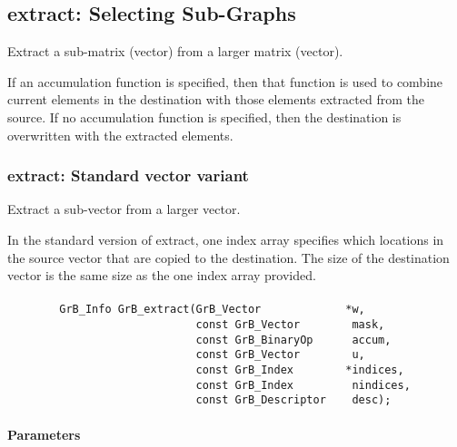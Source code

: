 \subsection{{\sf extract}: Selecting Sub-Graphs}
\label{Sec:extract}

Extract a sub-matrix (vector) from a larger matrix (vector). 

If an accumulation function is specified, then that function is
used to combine current elements in the destination with those elements
extracted from the source. If no accumulation function is specified, then
the destination is overwritten with the extracted elements.  


\subsubsection{{\sf extract}: Standard vector variant}

Extract a sub-vector from a larger vector. 

In the standard version of {\sf extract}, one index array
specifies which locations in the source vector that are copied to
the destination.  The size of the destination vector is the same size as
the one index array provided.  

\paragraph{\syntax}

\begin{verbatim}
        GrB_Info GrB_extract(GrB_Vector             *w,
                             const GrB_Vector        mask,
                             const GrB_BinaryOp      accum,
                             const GrB_Vector        u,
                             const GrB_Index        *indices,
                             const GrB_Index         nindices,
                             const GrB_Descriptor    desc);
\end{verbatim}

\paragraph{Parameters}

